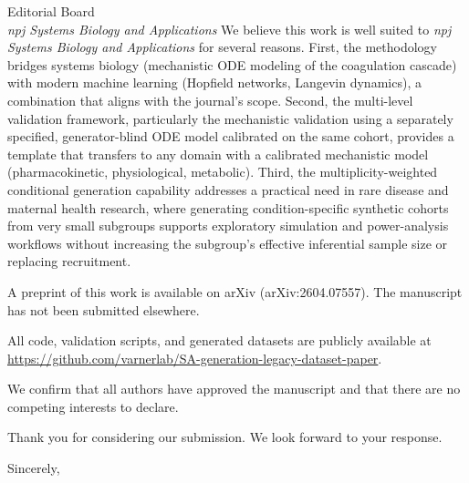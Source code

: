 \documentclass[11pt]{letter}
\begin{document}
\begin{letter}{Editorial Board\\
\textit{npj Systems Biology and Applications}}
We believe this work is well suited to \textit{npj Systems Biology and
Applications} for several reasons. First, the methodology bridges systems
biology (mechanistic ODE modeling of the coagulation cascade) with modern
machine learning (Hopfield networks, Langevin dynamics), a combination that
aligns with the journal's scope. Second, the multi-level validation framework,
particularly the mechanistic validation using a separately specified,
generator-blind ODE model calibrated on the same cohort, provides
a template that transfers to any domain with a calibrated mechanistic model
(pharmacokinetic, physiological, metabolic). Third, the multiplicity-weighted
conditional generation capability addresses a practical need in rare disease and
maternal health research, where generating condition-specific synthetic cohorts
from very small subgroups supports exploratory simulation and power-analysis
workflows without increasing the subgroup's effective inferential sample size or
replacing recruitment.

A preprint of this work is available on arXiv (arXiv:2604.07557). The
manuscript has not been submitted elsewhere.

All code, validation scripts, and generated datasets are publicly available at
\url{https://github.com/varnerlab/SA-generation-legacy-dataset-paper}.

We confirm that all authors have approved the manuscript and that there are no
competing interests to declare.

Thank you for considering our submission. We look forward to your response.

\closing{Sincerely,}

\end{letter}
\end{document}
